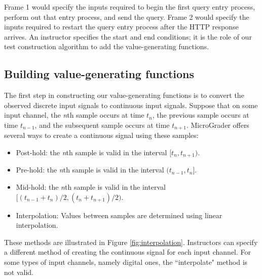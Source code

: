 \documentclass[12pt]{article}
\begin{document}
Frame 1 would specify the inputs required to begin the first query entry process, perform out that entry process, and send the query.  Frame 2 would specify the inputs required to restart the query entry process after the HTTP response arrives.  An instructor specifies the start and end conditions; it is the role of our test construction algorithm to add the value-generating functions.

\subsection{Building value-generating functions}
The first step in constructing our value-generating functions is to convert the observed discrete input signals to continuous input signals.  Suppose that on some input channel, the \textit{n}th sample occurs at time $t_n$, the previous sample occurs at time $t_{n-1}$, and the subsequent sample occurs at time $t_{n+1}$.  MicroGrader offers several ways to create a continuous signal using these samples:

\begin{itemize}
\item Post-hold: the \textit{n}th sample is valid in the interval $[t_n, t_{n+1})$.
\item Pre-hold: the \textit{n}th sample is valid in the interval $(t_{n-1}, t_n]$.
\item Mid-hold: the \textit{n}th sample is valid in the interval $[(t_{n-1} + t_n)/2, (t_n + t_{n+1})/2)$.
\item Interpolation: Values between samples are determined using linear interpolation. 
\end{itemize}

These methods are illustrated in Figure \ref{fig:interpolation}.  Instructors can specify a different method of creating the continuous signal for each input channel.  For some types of input channels, namely digital ones, the ``interpolate" method is not valid.
\end{document}
